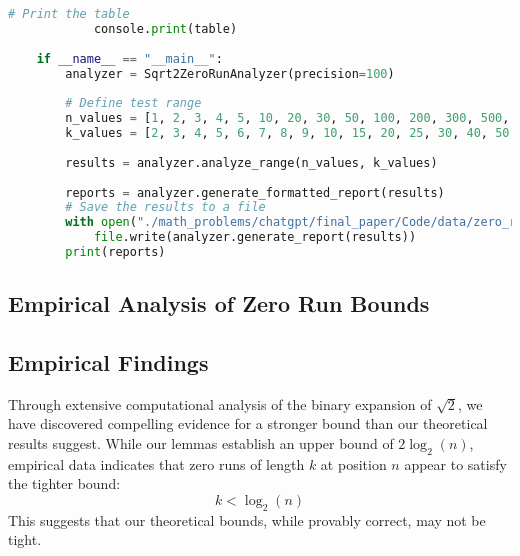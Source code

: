 \begin{lstlisting}[language=Python, style=pythonstyle, frame=single, caption={Zero Run Analysis Algorithm}]
            # Print the table
            console.print(table)
    
    if __name__ == "__main__":
        analyzer = Sqrt2ZeroRunAnalyzer(precision=100)
    
        # Define test range
        n_values = [1, 2, 3, 4, 5, 10, 20, 30, 50, 100, 200, 300, 500, 1000] 
        k_values = [2, 3, 4, 5, 6, 7, 8, 9, 10, 15, 20, 25, 30, 40, 50, 60, 70, 80, 90, 100, 200, 300, 500, 1000]
    
        results = analyzer.analyze_range(n_values, k_values)
    
        reports = analyzer.generate_formatted_report(results)
        # Save the results to a file
        with open("./math_problems/chatgpt/final_paper/Code/data/zero_run_analysis_report.txt", "w") as file:
            file.write(analyzer.generate_report(results))
        print(reports)
\end{lstlisting}

\subsection{Empirical Analysis of Zero Run Bounds}

\subsection{Empirical Findings}
Through extensive computational analysis of the binary expansion of $\sqrt{2}$, we have discovered compelling evidence for a stronger bound than our theoretical results suggest. While our lemmas establish an upper bound of $2\log_2(n)$, empirical data indicates that zero runs of length $k$ at position $n$ appear to satisfy the tighter bound:
\[
k < \log_2(n)
\]
This suggests that our theoretical bounds, while provably correct, may not be tight.

